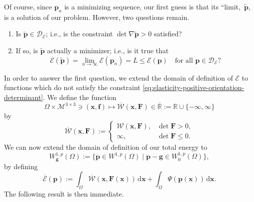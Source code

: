 Of course, since $\bm{p}_n$ is a minimizing sequence, our first guess is that its ``limit,\textquotesingle\textquotesingle\ $\widetilde{\bm{p}}$, is a solution of our problem. However, two questions remain.\begin{enumerate}\item Is $\widetilde{\bm{p}}\in\mathcal{D}_{\mathcal{E}}$; i.e., is the constraint $\det\nabla\widetilde{\bm{p}}>0$ satisfied?\item If so, is $\widetilde{\bm{p}}$ actually a minimizer; i.e., is it true that
\begin{equation}\label{eq:elasticity-weak-limit-minimizer-question}
\mathcal{E}(\widetilde{\bm{p}})=\lim_{n\to\infty}\mathcal{E}(\bm{p}_n)=L\leq\mathcal{E}(\bm{p})\quad\text{for all }\bm{p}\in\mathcal{D}_{\mathcal{E}}?
\end{equation}
\end{enumerate}

In order to answer the first question, we extend the domain of definition of $\mathcal{E}$ to functions which do not satisfy the constraint \eqref{eq:elasticity-positive-orientation-determinant}. We define the function
\begin{equation}\label{eq:elasticity-extended-stored-density-mapping}
\Omega\times\mathcal{M}^{3\times3}\ni(\bm{x},\bm{f})\mapsto\overline{\mathcal{W}}(\bm{x},\bm{F})\in\overline{\mathbb{R}}:=\mathbb{R}\cup\{-\infty,\infty\}
\end{equation}
by
\begin{equation}\label{eq:elasticity-extended-density-by-determinant}
\overline{\mathcal{W}}(\bm{x},\bm{F}):=\begin{cases}\mathcal{W}(\bm{x},\bm{F}),&\det\bm{F}>0,\\\infty,&\det\bm{F}\leq0.\end{cases}
\end{equation}
We can now extend the domain of definition of our total energy to
\begin{equation}\label{eq:elasticity-extended-sobolev-affine-domain}
W_{\bm{g}}^{1,p}(\Omega):=\{\bm{p}\in W^{1,p}(\Omega)\mid\bm{p}-\bm{g}\in W_0^{1,p}(\Omega)\},
\end{equation}
by defining
\begin{equation}\label{eq:elasticity-extended-total-energy-functional}
\overline{\mathcal{E}}(\bm{p}):=\int_\Omega\overline{\mathcal{W}}(\bm{x},\bm{F}(\bm{x}))\,\mathrm{d}\bm{x}+\int_\Omega\Psi(\bm{p}(\bm{x}))\,\mathrm{d}\bm{x}.
\end{equation}
The following result is then immediate.

